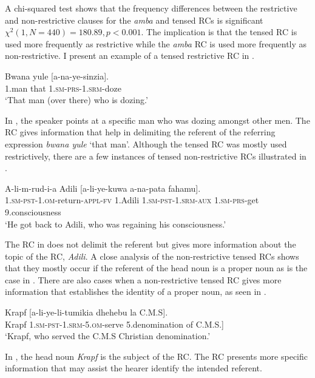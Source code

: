 \documentclass[output=paper,colorlinks,citecolor=brown]{langscibook}
\begin{document}
A chi-squared test shows that the frequency differences between the restrictive and non-restrictive clauses for the \textit{amba} and tensed RCs is significant $\chi^2 (1,\allowbreak N=440) = 180.89, p < 0.001$. The implication is that the tensed RC is used more frequently as restrictive while the \textit{amba} RC is used more frequently as non-restrictive. I present an example of a tensed restrictive RC in .

\ea%
    \label{ex:mwamzandi:14}
    \gll    Bwana yule [a-na-ye-sinzia].\\
            1.man  that  \textsc{1.sm-prs-1.srm-}doze\\
    \glt    ‘That man (over there) who is dozing.’
\z

In , the speaker points at a specific man who was dozing amongst other men. The RC gives information that help in delimiting the referent of the referring expression \textit{bwana yule} ‘that man’. Although the tensed RC was mostly used restrictively, there are a few instances of tensed non-restrictive RCs illustrated in .

\ea%
    \label{ex:mwamzandi:15}
    \gll    A-li-m-rud-i-a Adili [a-li-ye-kuwa a-na-pata fahamu].\\
            \textsc{1.sm-pst-1.om-}return\textsc{-appl-fv} 1.Adili \textsc{1.sm-pst-1.srm-aux} \textsc{1.sm-prs-}get 9.consciousness\\
    \glt    ‘He got back to Adili, who was regaining his consciousness.’
\z

The RC in  does not delimit the referent but gives more information about the topic of the RC, \textit{Adili}. A close analysis of the non-restrictive tensed RCs shows that they mostly occur if the referent of the head noun is a proper noun as is the case in . There are also cases when a non-restrictive tensed RC gives more information that establishes the identity of a proper noun, as seen in .

\ea%
    \label{ex:mwamzandi:16}
    \gll    Krapf [a-li-ye-li-tumikia dhehebu la C.M.S].\\
            Krapf  \textsc{1.sm-pst-1.srm-5.om-}serve 5.denomination of C.M.S.]\\
    \glt    ‘Krapf, who served the C.M.S Christian denomination.’
\z

In , the head noun \textit{Krapf} is the subject of the RC. The RC presents more specific information that may assist the hearer identify the intended referent.
\end{document}
